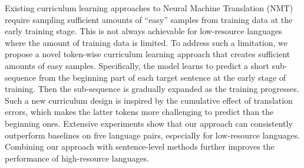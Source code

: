Existing curriculum learning approaches to Neural Machine Translation (NMT) require sampling sufficient amounts of ``easy'' samples from training data at the early training stage. This is not always achievable for low-resource languages where the amount of training data is limited. To address such a limitation, we propose a novel token-wise curriculum learning approach that creates sufficient amounts of easy samples. Specifically, the model learns to predict a short sub-sequence from the beginning part of each target sentence at the early stage of training. Then the sub-sequence is gradually expanded as the training progresses. Such a new curriculum design is inspired by the cumulative effect of translation errors, which makes the latter tokens more challenging to predict than the beginning ones. Extensive experiments show that our approach can consistently outperform baselines on five language pairs, especially for low-resource languages. Combining our approach with sentence-level methods further improves the performance of high-resource languages.

